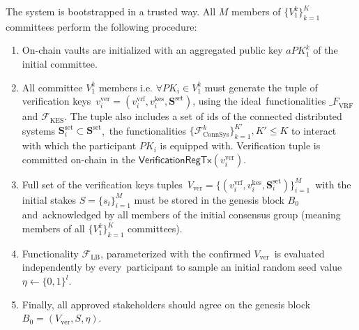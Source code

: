 The system is bootstrapped in a trusted way.
All $M$ members of $\{V^k_1\}_{k=1}^K$ committees perform the following procedure:
\begin{enumerate}
    \item On-chain vaults are initialized with an aggregated public key $aPK^k_1$ of the initial committee.

    \item All committee $V^k_1$ members i.e. ${\forall PK_i \in V^k_1}$ must generate the tuple of verification keys\
    ${v_i^{\text{ver}} = (v_i^{\text{vrf}}, v_i^{\text{kes}}, \mathbf{S}^{\text{set}})}$, using the ideal\
    functionalities ${\mathcal_{F}}_{\text{VRF}}$ and ${\mathcal{F}}_{\text{KES}}$.
    The tuple also includes a set of ids of the connected distributed systems $\mathbf{S}_i^{\text{set}} \subset \mathbf{S}^{\text{set}}$,\
    the functionalities ${\{\mathcal{F}^k_{\text{ConnSys}}\}_{k=1}^{K'}, K' \leq K}$ to interact with which the participant $PK_i$ is equipped with.
    Verification tuple is committed on-chain in the $\textsf{VerificationRegTx}(v_i^{\text{ver}})$.

    \item Full set of the verification keys tuples\
    ${V_{\text{ver}} = \{(v_i^{\text{vrf}}, v_i^{\text{kes}}, \mathbf{S}_i^{\text{set}})\}_{i=1}^{M}}$\
    with the initial stakes $S = \{s_i\}_{i=1}^{M}$ must be stored in the genesis block $B_0$ and\
    acknowledged by all members of the initial consensus group (meaning members of all $\{V^k_1\}_{k=1}^K$ committees).

    \item Functionality ${\mathcal{F}}_{\text{LB}}$, parameterized with the confirmed $V_\text{ver}$\
    is evaluated independently by every\
    participant to sample an initial random seed value $\eta \leftarrow \{0, 1\}^l$.

    \item Finally, all approved stakeholders should agree on the genesis block\
    ${B_0=\left(V_{\text{ver}}, S, \eta\right)}$.
\end{enumerate}

